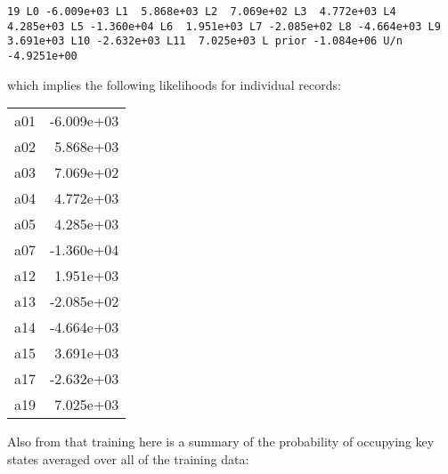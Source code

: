 \documentclass[12pt]{article}
\begin{document}
\begin{description}
\begin{verbatim}
19 L0 -6.009e+03 L1  5.868e+03 L2  7.069e+02 L3  4.772e+03 L4  4.285e+03 L5 -1.360e+04 L6  1.951e+03 L7 -2.085e+02 L8 -4.664e+03 L9  3.691e+03 L10 -2.632e+03 L11  7.025e+03 L prior -1.084e+06 U/n -4.9251e+00
\end{verbatim}
  which implies the following likelihoods for individual records:
  
  \begin{tabular*}{1.0\linewidth}{rr} 
    a01 & -6.009e+03 \\
    a02 & 5.868e+03 \\
    a03 & 7.069e+02 \\
    a04 & 4.772e+03 \\
    a05 & 4.285e+03 \\
    a07 & -1.360e+04 \\
    a12 & 1.951e+03 \\
    a13 & -2.085e+02 \\
    a14 & -4.664e+03 \\
    a15 & 3.691e+03 \\
    a17 & -2.632e+03 \\
    a19 & 7.025e+03
  \end{tabular*}
  Also from that training here is a summary of the probability of
  occupying key states averaged over all of the training data:
  

\end{description}
\end{document}
